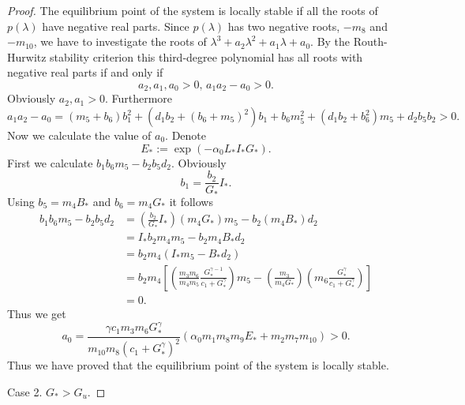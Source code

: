 \documentclass[pdflatex,sn-mathphys-num]{sn-jnl}
\theoremstyle{thmstyleone}
\theoremstyle{thmstyletwo}
\theoremstyle{thmstylethree}
\begin{document}
\begin{proof}
The equilibrium point of the system is locally stable if all the roots of $p(\lambda)$ have negative real parts. 
Since $p(\lambda)$ has two negative roots, $-m_8$ and $-m_{10}$, we have to investigate the roots of 
$\lambda^3+a_2\lambda^2+a_1\lambda+a_0$. By the Routh-Hurwitz stability criterion this third-degree polynomial has all 
roots with negative real parts if and only if 
\begin{equation}
a_2, a_1, a_0>0,\, a_1a_2-a_0>0. 
\end{equation}
Obviously $a_2,a_1>0$. Furthermore
\begin{equation}
a_1a_2-a_0=(m_5+b_6)b_1^2+(d_1b_2+(b_6+m_5)^2)b_1+b_6m_5^2+(d_1b_2+b_6^2)m_5+d_2b_5b_2>0.
\end{equation}
Now we calculate the value of $a_0$. Denote 
\begin{equation}
E_{*}:=\exp\left( -\alpha_0 L_{*} I_{*} G_{*} \right).
\end{equation}
First we calculate $b_1b_6m_5-b_2b_5d_2$. Obviously
\begin{equation}
b_1=\frac{b_2}{G_{*}}I_{*}.
\end{equation}
Using $b_5=m_4 B_{*}$ and $b_6=m_4 G_{*}$ it follows 
\begin{align}
b_1b_6m_5-b_2b_5d_2 &=\left(\frac{b_2}{G_{*}}I_{*} \right)(m_4 G_{*})m_5-b_2(m_4B_{*})d_2 \nonumber \\
&=I_{*}b_2m_4m_5-b_2m_4B_{*}d_2 \nonumber\\
&=b_2m_4(I_{*}m_5-B_{*}d_2) \nonumber\\
&=b_2m_4\left[\left( \frac{m_3m_6}{m_4m_5}\frac{G_{*}^{\gamma-1}}{c_1+G_{*}^{\gamma}} \right)m_5 -
\left( \frac{m_3}{m_4G_{*}}\right) \left( m_6\frac{G_{*}^{\gamma}}{c_1+G_{*}^{\gamma}}  \right)   \right] \nonumber\\
&=0. \label{eq:a0_zero}
\end{align}
Thus we get
\begin{equation}
a_0=\frac{\gamma c_1 m_3 m_6 G_{*}^{\gamma}}{m_{10}m_8 (c_1+G_{*}^{\gamma})^2}(\alpha_0 m_1m_8m_9E_{*}+m_2m_7m_{10})>0.
\end{equation}
Thus we have proved that the equilibrium point of the system is locally stable.

Case 2. $G_{*}>G_u$. 


\end{proof}
\end{document}
